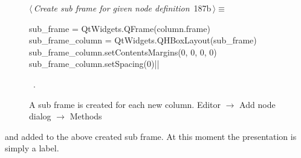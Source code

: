 \documentclass[%
    a4paper,    %
    justified,  %
    nobib,      %
    openany     %
]{tufte-book}
\makeatletter
\renewcommand{\label}[1]{\@tufte@label{##1}}%
\makeatother
\begin{document}
\begin{figure}[!htbp]
\begin{flushleft} \small
\begin{minipage}{\linewidth}\label{scrap166}\raggedright\small
{} $\langle\,${\itshape Create sub frame for given node definition}\nobreak\ {\footnotesize {187b}}$\,\rangle\equiv$
\vspace{-1ex}
\begin{pythoncode}
    sub_frame = QtWidgets.QFrame(column.frame)
    sub_frame_column = QtWidgets.QHBoxLayout(sub_frame)
    sub_frame_column.setContentsMargins(0, 0, 0, 0)
    sub_frame_column.setSpacing(0)|\NWsep|
\end{pythoncode}
\vspace{1.5ex}
\footnotesize
\begin{list}{}{\setlength{\itemsep}{-\parsep}\setlength{\itemindent}{-\leftmargin}}
\item \NWtxtMacroRefIn\ .

\item{}
\end{list}
\end{minipage}\vspace{4ex}
\end{flushleft}
\caption{A sub frame is created for each new column.
  \newline{}\newline{}Editor $\rightarrow$ Add node dialog $\rightarrow$ Methods}
\end{figure}

 and added to the above
created sub frame. At this moment the presentation is simply a label.
\end{document}

